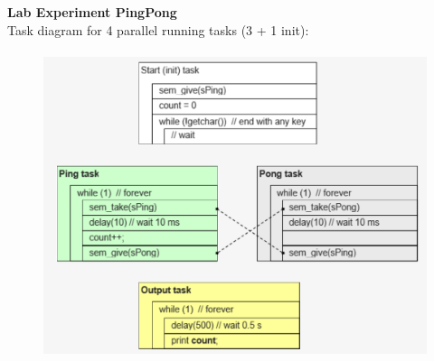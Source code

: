 \os{\newpage}
{\rot\bf Lab Experiment PingPong}\\

Task diagram for 4 parallel running tasks (3 + 1 init):\\

 	\begin{figure}[h]
    \centering
    \includegraphics[width=13cm, height=9cm]{Images/image133.png}
    \label{fig:Fig 83}
    \end{figure}

